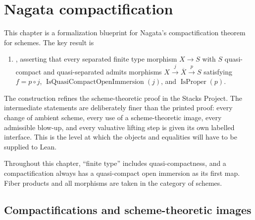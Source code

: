 %

\chapter{Nagata compactification}

This chapter is a formalization blueprint for Nagata's compactification
theorem for schemes.  The key result is
\begin{enumerate}
  \item {}, asserting that every separated
  finite type morphism $X\to S$ with $S$ quasi-compact and quasi-separated
  admits morphisms $X\xrightarrow{j}\overline X\xrightarrow{p}S$ satisfying
  $f=p\circ j$, $\operatorname{IsQuasiCompactOpenImmersion}(j)$, and
  $\operatorname{IsProper}(p)$.
\end{enumerate}

The construction refines the scheme-theoretic proof in the Stacks Project.  The
intermediate statements are deliberately finer than the printed proof: every
change of ambient scheme, every use of a scheme-theoretic image, every
admissible blow-up, and every valuative lifting step is given its own labelled
interface.  This is the level at which the objects and equalities will have to
be supplied to Lean.

Throughout this chapter, ``finite type'' includes quasi-compactness, and a
compactification always has a quasi-compact open immersion as its first map.
Fiber products and all morphisms are taken in the category of schemes.

\section{Compactifications and scheme-theoretic images}


